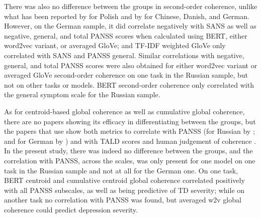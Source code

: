 There was also no difference between the groups in second-order coherence, unlike what has been reported by \citet{sarzynska2021detecting} for Polish and by \citet{parola2022speech} for Chinese, Danish, and German. However, on the German sample, it did correlate negatively with SANS as well as negative, general, and total PANSS scores when calculated using BERT, either word2vec variant, or averaged GloVe; and TF-IDF weighted GloVe only correlated with SANS and PANSS general. Similar correlations with negative, general, and total PANSS scores were also obtained for either word2vec variant or averaged GloVe second-order coherence on one task in the Russian sample, but not on other tasks or models. BERT second-order coherence only correlated with the general symptom scale for the Russian sample.




As for centroid-based global coherence as well as cumulative global coherence, there are no papers showing its efficacy in differentiating between the groups, but the papers that use show both metrics to correlate with PANSS (for Russian by \citet{ryazanskaya2020thesis}; and for German by \citet{just2023validation}) and with TALD scores and human judgement of coherence \citep{xu2020centroid, xu2022fully}. In the present study, there was indeed no difference between the groups, and the correlation with PANSS, across the scales, was only present for one model on one task in the Russian sample and not at all for the German one. On one task, BERT centroid and cumulative centroid global coherence correlated positively with all PANSS subscales, as well as being predictive of TD severity; while on another task no correlation with PANSS was found, but averaged w2v global coherence could predict depression severity.


